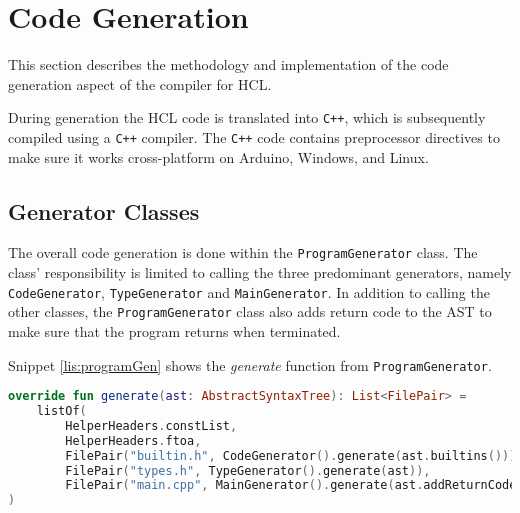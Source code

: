 \section{Code Generation}
This section describes the methodology and implementation of the code generation aspect of the compiler for HCL. 

During generation the HCL code is translated into \texttt{C++}, which is subsequently compiled using a \texttt{C++} compiler.
The \texttt{C++} code contains preprocessor directives to make sure it works cross-platform on Arduino, Windows, and Linux.



\subsection{Generator Classes}

The overall code generation is done within the \texttt{ProgramGenerator} class.
The class' responsibility is limited to calling the three predominant generators, namely \texttt{CodeGenerator}, \texttt{TypeGenerator} and \texttt{MainGenerator}.
In addition to calling the other classes, the \texttt{ProgramGenerator} class also adds return code to the AST to make sure that the program returns when terminated. 

Snippet \ref{lis:programGen} shows the \textit{generate} function from \texttt{ProgramGenerator}.

\begin{lstlisting}[language=Kotlin,label=lis:programGen,caption=The implementation of \textit{generate} in \texttt{ProgramGenerator}.]
override fun generate(ast: AbstractSyntaxTree): List<FilePair> = 
	listOf(
		HelperHeaders.constList,
		HelperHeaders.ftoa,
		FilePair("builtin.h", CodeGenerator().generate(ast.builtins())),
		FilePair("types.h", TypeGenerator().generate(ast)),
		FilePair("main.cpp", MainGenerator().generate(ast.addReturnCode().notBuiltins()))
)
\end{lstlisting}

